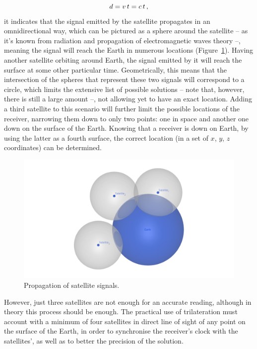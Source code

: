\begin{equation}\label{eq:2_1}
    d = v\,t = c\,t\,,\medskip
\end{equation}
it indicates that the signal emitted by the satellite propagates in an omnidirectional way, which can be pictured as a sphere around the satellite -- as it's known from radiation and propagation of electromagnetic waves theory --, meaning the signal will reach the Earth in numerous locations (Figure~\ref{fig:omnidirectional}).
Having another satellite orbiting around Earth, the signal emitted by it will reach the surface at some other particular time. Geometrically, this means that the intersection of the spheres that represent these two signals will correspond to a circle, which limits the extensive list of possible solutions -- note that, however, there is still a large amount --, not allowing yet to have an exact location. Adding a third satellite to this scenario will further limit the possible locations of the receiver, narrowing them down to only two points: one in space and another one down on the surface of the Earth. Knowing that a receiver is down on Earth, by using the latter as a fourth surface, the correct location (in a set of $x$, $y$, $z$ coordinates) can be determined.
\begin{figure}[ht]
	\centering
	\includegraphics[width=1.0\textwidth]{Chapters/Figures/omnidirectional.png}
	\caption{Propagation of satellite signals.}
	\label{fig:omnidirectional}
\end{figure}
However, just three satellites are not enough for an accurate reading, although in theory this process should be enough. The practical use of trilateration must account with a minimum of four satellites in direct line of sight of any point on the surface of the Earth, in order to synchronise the receiver's clock with the satellites', as well as to better the precision of the solution.
